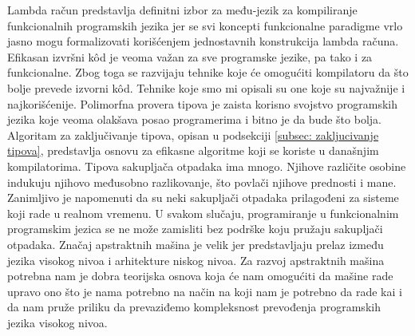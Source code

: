 \documentclass[a4paper]{article}
\begin{document}
Lambda račun predstavlja definitni izbor za među-jezik za kompiliranje funkcionalnih programskih jezika jer se svi koncepti funkcionalne paradigme vrlo jasno mogu formalizovati korišćenjem jednostavnih konstrukcija lambda računa. Efikasan izvršni k\^od je veoma važan za sve programske jezike, pa tako i za funkcionalne. Zbog toga se razvijaju tehnike koje će omogućiti kompilatoru da što bolje prevede izvorni k\^od. Tehnike koje smo mi opisali su one koje su najvažnije i najkorišćenije. Polimorfna provera tipova je zaista korisno svojstvo programskih jezika koje veoma olakšava posao programerima i bitno je da bude što bolja. Algoritam za zaključivanje tipova, opisan u podsekciji \ref{subsec: zakljucivanje tipova}, predstavlja osnovu za efikasne algoritme koji se koriste u današnjim kompilatorima. Tipova sakupljača otpadaka ima mnogo. Njihove različite osobine indukuju njihovo međusobno razlikovanje, što povlači njihove prednosti i mane. Zanimljivo je napomenuti da su neki sakupljači otpadaka prilagođeni za sisteme koji rade u realnom vremenu. U svakom slučaju, programiranje u funkcionalnim programskim jezica se ne može zamisliti bez podrške koju pružaju sakupljači otpadaka. Značaj apstraktnih mašina je velik jer predstavljaju prelaz između jezika visokog nivoa i arhitekture niskog nivoa. Za razvoj apstraktnih mašina potrebna nam je dobra teorijska osnova koja će nam omogućiti da mašine rade upravo ono što je nama potrebno
na način na koji nam je potrebno da rade kai i da nam pruže priliku da prevaziđemo kompleksnost prevođenja programskih jezika visokog nivoa.


\appendix
 


\end{document}
